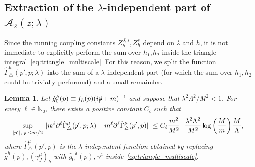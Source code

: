 \documentclass[a4paper, 11pt]{article}
\newcommand{\N}{\mathbb{N}}
\newcommand{\cutoff}{\Lambda}								%
\newcommand{\sing}[2]{{#1}^{#2}}							%
\theoremstyle{thm}
\newtheorem{lm}{Lemma}
\begin{document}
\subsection{Extraction of the \texorpdfstring{$\lambda$}{lambda}-independent part of \texorpdfstring{$\mathcal{A}_2(z; \lambda)$}{a}}
\label{subsec:lambda_independent_triangle} 

Since the running coupling constants $Z^{J, s}_h, Z^s_h$ depend on $\lambda$ and $h$, it is not immediate to explicitly perform the sum over $h_1, h_2$ inside the triangle integral~\eqref{eq:triangle_multiscale}. For this reason, we split the function $\hat{\Gamma}^\mu_\triangle(p', p; \lambda)$ into the sum of a $\lambda$-independent part (for which the sum over $h_1, h_2$ could be trivially performed) and a small remainder. 

\begin{lm}
\label{lm:sum_over_scales}
Let $\sing{\hat{g}_0}{h}(p) \equiv f_h(p)(i \slashed{p} + m)^{-1}$ and suppose that $\lambda^2 \cutoff^2/M^2 < 1$. For every $\ell \in \N_0$, there exists a positive constant $C_\ell$ such that
\begin{equation}
\label{eq:sum_over_scales_estimate}
\sup_{\abs*{p'}, \abs{p} \le m/2} \norm*{m^\ell \partial^\ell \hat{\Gamma}^\mu_\triangle(p', p; \lambda) - m^\ell \partial^\ell \hat{\Gamma}^\mu_\triangle(p', p)} \le C_\ell \frac{m^2}{M^2} \cdot \frac{\lambda^2 \cutoff^2}{M^2} \log \left( \frac{M}{m} \right) \frac{M}{\cutoff},
\end{equation}
where $\hat{\Gamma}^\mu_\triangle(p', p)$ is the $\lambda$-independent function obtained by replacing $\sing{\hat{g}}{h}(p), (\gamma^\mu_J)_h$ with $\sing{\hat{g}_0}{h}(p), \gamma^\mu$ inside~\eqref{eq:triangle_multiscale}.
\end{lm}
\end{document}
